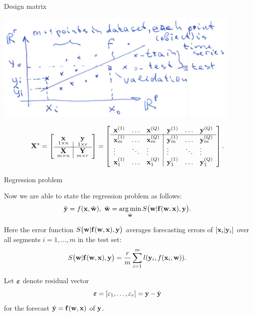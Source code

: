 \documentclass{beamer}
\begin{document}
\begin{frame}{Design matrix}


\includegraphics[width=0.9\textwidth]{forecasting_model.png}

\[
{\mathbf{X}}^*= \left[
\begin{array}{c|c}
\underset{1{\times}n}{{\mathbf{x}}} & \underset{1{\times}r}{{{\mathbf{y}}}}  \\
\hline
 \underset{m{\times}n}{{\mathbf{X}}} & \underset{m{\times}r}{\mathbf{Y}}  \\
 \end{array}
\right] =  \left[
\begin{array}{lll|lll}
{\mathbf{x}}^{(1)} & \dots & {\mathbf{x}}^{(Q)} & {\mathbf{y}}^{(1)} &  \dots & {{\mathbf{y}}}^{(Q)}   \\
\hline
{\mathbf{x}}_m^{(1)}  & \dots & {\mathbf{x}}_m^{(Q)} & {\mathbf{y}}_m^{(1)} &  \dots & {\mathbf{y}}_m^{(Q)}   \\
\vdots & \ddots & \vdots & \vdots & \ddots & \vdots  \\
{\mathbf{x}}_1^{(1)} & \dots & {\mathbf{x}}_1^{(Q)} & {\mathbf{y}}_1^{(1)}  & \dots & {\mathbf{y}}_1^{(Q)}   \\


\end{array}
\right]. \]

\end{frame}
%
%
\begin{frame}{Regression problem}

Now we are able to state the regression problem as follows:
\begin{equation}\label{eq:regression_problem}
\hat{\y} = f(\x, \hat{\w}), ~\hat{\w} = \argmin_{\hat{\w}}S\bigl(\bw|\fx(\bw,\bx),\by\bigr). %
\end{equation}

Here the error function $S\bigl(\mathbf{w}|{\mathbf{f}}(\mathbf{w},{\mathbf{x}}),{\mathbf{y}}\bigr)$ averages forecasting errors of  $[{\mathbf{x}}_i | {\mathbf{y}}_i]$  over all segments $i = 1, \dots, m$ in the test set:
\[ S\bigl(\mathbf{w}|{\mathbf{f}}(\mathbf{w},{\mathbf{x}}),{\mathbf{y}}\bigr) = \frac{r}{m}\sum_{i=1}^{m} l({\mathbf{y}}_i, f({\mathbf{x}}_i, {\mathbf{w}})).\]

Let ${\boldsymbol{\varepsilon}}$ denote residual vector
\[ {\boldsymbol{\varepsilon}} = [\varepsilon_1, \dots, \varepsilon_r] = {\mathbf{y}} - \hat{{\mathbf{y}}}\]
for the forecast $\hat{{\mathbf{y}}} = {\mathbf{f}}(\mathbf{w},{\mathbf{x}})$ of ${\mathbf{y}}$.


\end{frame}
\end{document}
